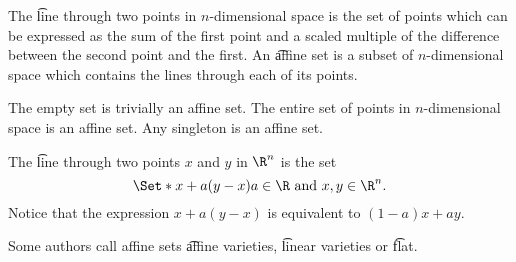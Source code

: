 


The \t{line through} two points in $n$-dimensional space is the set of points which can be expressed as the sum of the first point and a scaled multiple of the difference between the second point and the first.
An \t{affine set} is a subset of $n$-dimensional space which contains the lines through each of its points.


The empty set is trivially an affine set.
The entire set of points in $n$-dimensional space is an affine set.
Any singleton is an affine set.


The \t{line through} two points $x$ and $y$ in $\R^n$ is the set
$$
  \Set*{x + a(y - x)}{a \in \R \text{ and } x, y \in \R^n}.
$$
Notice that the expression $x + a(y - x)$ is equivalent to $(1 - a)x + ay$.


Some authors call affine sets \t{affine varieties}, \t{linear varieties} or \t{flat}.

